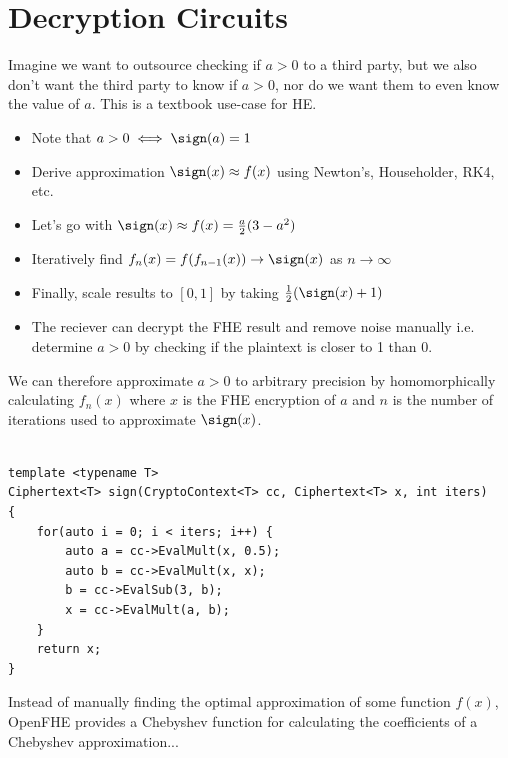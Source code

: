 \section{Decryption Circuits}
Imagine we want to outsource checking if $a > 0$ to a third party, but we also don't want the third party to know if $a > 0$, nor do we want them to even know the value of $a$. This is a textbook use-case for HE. 

\begin{itemize}
    \item Note that $a > 0 \iff \sign(a) = 1$
    \item Derive approximation $\sign(x) \approx f(x)$ using Newton's, Householder, RK4, etc.
    \item Let's go with $\sign(x) \approx f(x) = \frac{a}{2}(3 - a^2)$
    \item Iteratively find $f_n(x) = f(f_{n-1}(x)) \to \sign(x)$ as $n \to \infty$
    \item Finally, scale results to $[0,1]$ by taking $\frac{1}{2}(\sign(x) + 1)$
    \item The reciever can decrypt the FHE result and remove noise manually i.e. determine $a > 0$ by checking if the plaintext is closer to 1 than 0.
\end{itemize}

We can therefore approximate $a > 0$ to arbitrary precision by homomorphically calculating $f_n(x)$ where $x$ is the FHE encryption of $a$ and $n$ is the number of iterations used to approximate $\sign(x)$.

\begin{algorithm}[h]
  \caption{The Hello World! program in Java.}
  \label{algo:fhe:sign}
  \begin{verbatim}
  
template <typename T>
Ciphertext<T> sign(CryptoContext<T> cc, Ciphertext<T> x, int iters)
{
    for(auto i = 0; i < iters; i++) {
        auto a = cc->EvalMult(x, 0.5);
        auto b = cc->EvalMult(x, x);
        b = cc->EvalSub(3, b);
        x = cc->EvalMult(a, b);
    }
    return x;
}
\end{verbatim}
\end{algorithm}

Instead of manually finding the optimal approximation of some function $f(x)$, OpenFHE provides a Chebyshev function for calculating the coefficients of a Chebyshev approximation... 

